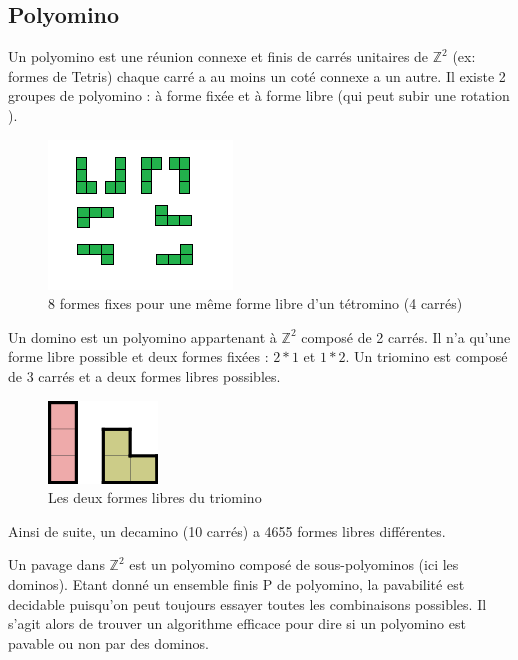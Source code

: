 \documentclass{article}
\begin{document}
\clearpage

\subsection{Polyomino}

Un polyomino est une réunion connexe et finis de carrés unitaires de $\mathbb{Z}^{2}$ (ex: formes de Tetris) chaque carré a au moins un coté connexe a un autre.
Il existe 2 groupes de polyomino : à forme fixée et à forme libre (qui peut subir une rotation ).

\begin{figure} [!h]
    \center
    \includegraphics [scale=0.5] {image/polyomino_libre.png}
    \caption{8 formes fixes pour une même forme libre d'un tétromino (4 carrés)}
\end{figure}

\hspace{1cm}

Un domino est un polyomino appartenant à $\mathbb{Z}^{2}$ composé de 2 carrés. Il n’a qu’une forme libre possible et deux formes fixées : $2*1$ et $1*2$.
Un triomino est composé de 3 carrés et a deux formes libres possibles.

\hspace{1cm}

\begin{figure} [!h]
    \center
    \includegraphics [scale=0.5] {image/triomino.png}
    \caption{Les deux formes libres du triomino}
\end{figure}

\hspace{1cm}

Ainsi de suite, un decamino (10 carrés) a 4655 formes libres différentes.

Un pavage dans $\mathbb{Z}^{2}$ est un polyomino composé de sous-polyominos (ici les dominos).
Etant donné un ensemble finis P de polyomino, la pavabilité est decidable puisqu'on peut toujours essayer toutes les combinaisons possibles.
Il s'agit alors de trouver un algorithme efficace pour dire si un polyomino est pavable ou non par des dominos.
\end{document}
